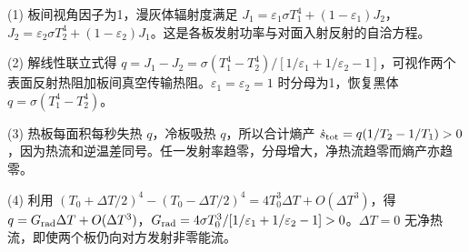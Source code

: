 (1) 板间视角因子为1，漫灰体辐射度满足 \(J_1=\varepsilon_1\sigma T_1^4+(1-\varepsilon_1)J_2\)，\(J_2=\varepsilon_2\sigma T_2^4+(1-\varepsilon_2)J_1\)。这是各板发射功率与对面入射反射的自洽方程。

(2) 解线性联立式得 \(q=J_1-J_2=\sigma(T_1^4-T_2^4)/[1/\varepsilon_1+1/\varepsilon_2-1]\)，可视作两个表面反射热阻加板间真空传输热阻。\(\varepsilon_1=\varepsilon_2=1\) 时分母为1，恢复黑体 \(q=\sigma(T_1^4-T_2^4)\)。

(3) 热板每面积每秒失热 \(q\)，冷板吸热 \(q\)，所以合计熵产 \(\dot s_{\rm tot}=q(1/T_2-1/T_1)>0\)，因为热流和逆温差同号。任一发射率趋零，分母增大，净热流趋零而熵产亦趋零。

(4) 利用 \((T_0+\Delta T/2)^4-(T_0-\Delta T/2)^4=4T_0^3\Delta T+O(\Delta T^3)\)，得 \(q=G_{\rm rad}\Delta T+O(\Delta T^3)\)，\(G_{\rm rad}=4\sigma T_0^3/[1/\varepsilon_1+1/\varepsilon_2-1]>0\)。\(\Delta T=0\) 无净热流，即使两个板仍向对方发射非零能流。
